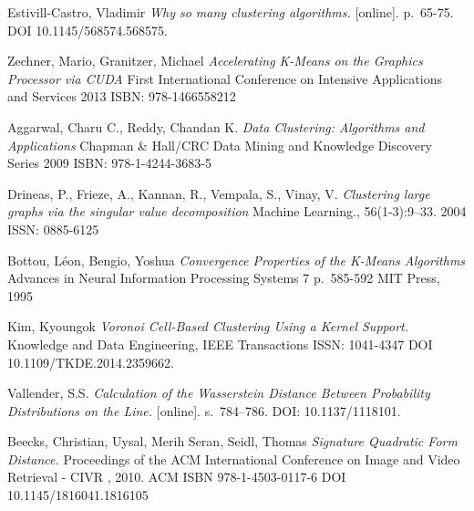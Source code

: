 
\def\bibname{Bibliography}
\begin{thebibliography}{99}
\addcontentsline{toc}{chapter}{\bibname}


{\sc Estivill-Castro,} Vladimir
\emph{Why so many clustering algorithms.}
[online]. p.~65-75. DOI 10.1145/568574.568575.

{\sc Zechner,} Mario, {\sc Granitzer, } Michael
\emph{Accelerating K-Means on the Graphics Processor via CUDA}
First International Conference on Intensive Applications and Services
2013
ISBN: 978-1466558212 

{\sc Aggarwal,} Charu C., {\sc Reddy, } Chandan K.
\emph{Data Clustering: Algorithms and Applications}
Chapman \& Hall/CRC Data Mining and Knowledge Discovery Series
2009
ISBN: 978-1-4244-3683-5

{\sc Drineas,} P., {\sc Frieze,} A., {\sc Kannan,} R., {\sc Vempala,}  S., {\sc Vinay,}  V.
\emph{Clustering large graphs via the singular value decomposition}
Machine Learning., 56(1-3):9–33.
2004
ISSN: 0885-6125

{\sc Bottou,} L\'{e}on, {\sc Bengio,} Yoshua
\emph{Convergence Properties of the K-Means Algorithms}
Advances in Neural Information Processing Systems 7
p.~585-592
MIT Press, 1995

{\sc Kim,} Kyoungok
\emph{Voronoi Cell-Based Clustering Using a Kernel Support.}
Knowledge and Data Engineering, IEEE Transactions
ISSN: 1041-4347
DOI 10.1109/TKDE.2014.2359662. 

{\sc Vallender,} S.S.
\emph{Calculation of the Wasserstein Distance Between Probability Distributions on the Line.}
[online]. s.~784--786. DOI: 10.1137/1118101.

{\sc Beecks,} Christian, {\sc Uysal,} Merih Seran, {\sc Seidl,} Thomas
\emph{Signature Quadratic Form Distance.}
Proceedings of the ACM International Conference on Image and Video Retrieval - CIVR , 2010.
ACM
ISBN 978-1-4503-0117-6
DOI 10.1145/1816041.1816105


\end{thebibliography}
